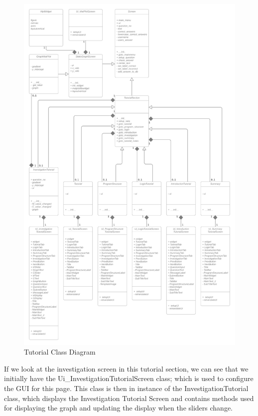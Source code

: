 \documentclass[12pt]{article}
\begin{document}
\clearpage
\begin{figure}[ht]
    \centering
    \captionsetup{justification=centering}
    \includegraphics[width=6in]{tutorial-class-diagram}
    \caption{Tutorial Class Diagram}
\end{figure}
\clearpage

If we look at the investigation screen in this tutorial section, we can see that we initially have the Ui\_InvestigationTutorialScreen class; which is used to configure the GUI for this page. This class is then in instance of the InvestigationTutorial class, which displays the Investigation Tutorial Screen and contains methods used for displaying the graph and updating the display when the sliders change.
\end{document}
